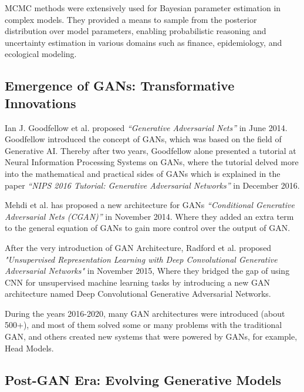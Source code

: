 \noindent
MCMC methods were extensively used for Bayesian parameter estimation in complex models. They provided a means to sample from the posterior distribution over model parameters, enabling probabilistic reasoning and uncertainty estimation in various domains such as finance, epidemiology, and ecological modeling.


\subsection{Emergence of GANs: Transformative Innovations}

Ian J. Goodfellow et al. \cite{GAN_Main} proposed \textit{“Generative Adversarial Nets”} in June 2014. Goodfellow introduced the concept of GANs, which was based on the field of Generative AI. Thereby after two years, Goodfellow alone presented a tutorial at Neural Information Processing Systems on GANs, where the tutorial delved more into the mathematical and practical sides of GANs which is explained in the paper \textit{“NIPS 2016 Tutorial: Generative Adversarial Networks”}\cite{Nips_GAN} in December 2016.

\noindent
Mehdi et al. has proposed a new architecture for GANs \textit{“Conditional Generative Adversarial Nets (CGAN)”}\cite{CGAN} in November 2014. Where they added an extra term to the general equation of GANs to gain more control over the output of GAN.

\noindent
After the very introduction of GAN Architecture, Radford et al. proposed \textit{"Unsupervised Representation Learning with Deep Convolutional Generative Adversarial Networks"}\cite{DCGAN} in November 2015, Where they bridged the gap of using CNN for unsupervised machine learning tasks by introducing a new GAN architecture named Deep Convolutional Generative Adversarial Networks.

\noindent
During the years 2016-2020, many GAN architectures were introduced (about 500+), and most of them solved some or many problems with the traditional GAN, and others created new systems that were powered by GANs, for example, Head Models\cite{Head_Model}. 

\clearpage


\subsection{Post-GAN Era: Evolving Generative Models}

